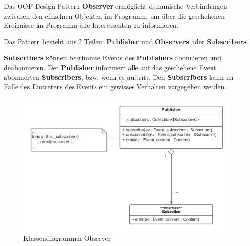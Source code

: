 Das OOP Design Pattern \textbf{Observer} ermöglicht dynamische Verbindungen zwischen den einzelnen 
Objekten im Programm, um über die geschehenen Ereignisse im Programm alle Interessenten 
zu informieren.

Das Pattern besteht aus 2 Teilen: \textbf{Publisher} und \textbf{Observers} oder \textbf{Subscribers}

\textbf{Subscribers} können bestimmte Events des \textbf{Publishers} abonnieren und deabonnieren. 
Der \textbf{Publisher} informiert alle auf das geschehene Event abonnierten \textbf{Subscribers}, bzw. wenn es auftritt. 
Den \textbf{Subscribers} kann im Falle des Eintretens des Events ein gewisses Verhalten vorgegeben werden.


\begin{figure}[H]
    \centering
    \includegraphics[width=1\textwidth]{Images/Observer.png}
    \caption[UML Observer]{Klassendiagrammm Observer \footnotemark}
    \label{fig:flow around cylinder}
\end{figure}
